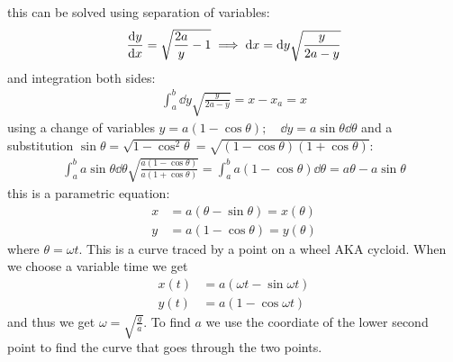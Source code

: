 \documentclass[../main.tex]{subfiles}
\begin{document}
this can be solved using separation of variables:
\begin{align*}
    \dv{y}{x} = \sqrt{\frac{2a}{y} - 1} \implies \dd x = \dd y \sqrt{\frac{y}{2a - y}}
\end{align*}
and integration both sides:
\begin{align*}
    \int_a^b \dd y \sqrt{\frac{y}{2a - y}} = x - x_a = x
\end{align*}
using a change of variables $y = a (1 - \cos \theta); \quad \dd y = a \sin \theta \dd \theta$ and 
a substitution $\sin\theta = \sqrt{1 - \cos^2 \theta} = \sqrt{(1 - \cos\theta)(1 + \cos\theta)}$:
\begin{align*}
    \int_a^b a \sin \theta \dd \theta \sqrt{\frac{a(1 - \cos \theta)}{a (1 + \cos \theta)}}
    = \int_a^b a(1 - \cos \theta) \dd \theta = a \theta - a \sin \theta
\end{align*}
this is a parametric equation:
\begin{align*}
    x &= a(\theta - \sin \theta) = x(\theta)\\
    y &= a(1 - \cos \theta) = y(\theta)
\end{align*}
where $\theta = \omega t$. This is a curve traced by a point on a wheel AKA cycloid. When we choose
a variable time we get
\begin{align*}
    x(t) &= a(\omega t - \sin \omega t) \\
    y(t) &= a(1 - \cos \omega t)
\end{align*}
and thus we get $\omega = \sqrt{\frac{g}{a}}$. To find $a$ we use the coordiate of the lower second point to find
the curve that goes through the two points.
\end{document}
